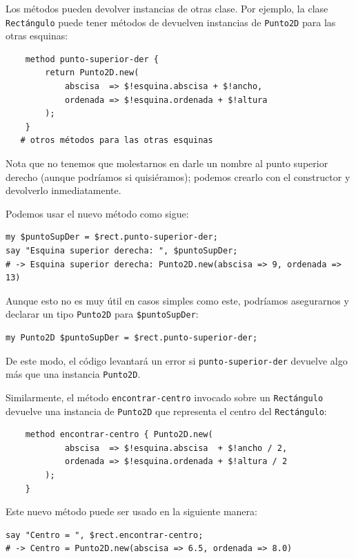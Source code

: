 Los métodos pueden devolver instancias de otras clase. 
Por ejemplo, la clase {\tt Rectángulo} puede tener métodos
de devuelven instancias de {\tt Punto2D} para las otras
esquinas:

\begin{lstlisting}
    method punto-superior-der {
        return Punto2D.new(
            abscisa  => $!esquina.abscisa + $!ancho, 
            ordenada => $!esquina.ordenada + $!altura
        );
    }
   # otros métodos para las otras esquinas
\end{lstlisting}

Nota que no tenemos que molestarnos en darle un nombre al
punto superior derecho (aunque podríamos si quisiéramos);
podemos crearlo con el constructor y devolverlo inmediatamente.

Podemos usar el nuevo método como sigue:

\begin{lstlisting}
my $puntoSupDer = $rect.punto-superior-der;
say "Esquina superior derecha: ", $puntoSupDer;
# -> Esquina superior derecha: Punto2D.new(abscisa => 9, ordenada => 13)
\end{lstlisting}

Aunque esto no es muy útil en casos simples como este, 
podríamos asegurarnos y declarar un tipo {\tt Punto2D}
para \verb|$puntoSupDer|:

\begin{lstlisting}
my Punto2D $puntoSupDer = $rect.punto-superior-der;
\end{lstlisting} 

De este modo, el código levantará un error si {\tt punto-superior-der}
devuelve algo más que una instancia {\tt Punto2D}.

Similarmente, el método \verb|encontrar-centro| invocado 
sobre un {\tt Rectángulo} devuelve una instancia de 
{\tt Punto2D} que representa el centro del {\tt Rectángulo}:

\begin{lstlisting}
    method encontrar-centro { Punto2D.new(
            abscisa  => $!esquina.abscisa  + $!ancho / 2, 
            ordenada => $!esquina.ordenada + $!altura / 2
        );
    }
\end{lstlisting}
%
Este nuevo método puede ser usado en la siguiente manera:

\begin{lstlisting}
say "Centro = ", $rect.encontrar-centro;
# -> Centro = Punto2D.new(abscisa => 6.5, ordenada => 8.0)
\end{lstlisting}
%


